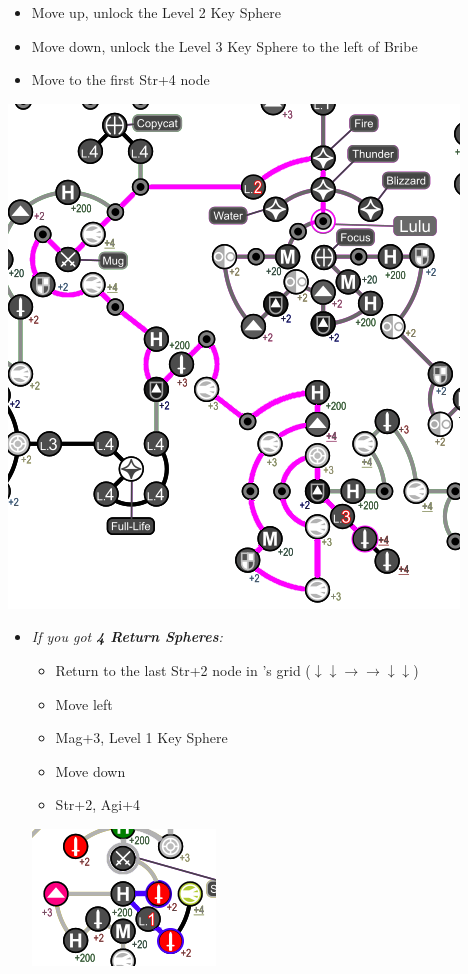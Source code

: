 \begin{spheregrid}
  \begin{multicols}{2}
    \begin{itemize}
      \luluf
      \begin{itemize}
        \item Move up, unlock the Level 2 Key Sphere
        \item Move down, unlock the Level 3 Key Sphere to the left of Bribe
        \item Move to the first Str+4 node
      \end{itemize}
      \includegraphics[width=.75\columnwidth]{graphics/lulu_grid}
      \yunaf
      \begin{itemize}
        \item \textit{If you got \textbf{4 Return Spheres}:}
              \begin{itemize}
                \item Return to the last Str+2 node in \wakka's grid ($\downarrow \downarrow \rightarrow \rightarrow \downarrow \downarrow$)
                \item Move left
                \item Mag+3, Level 1 Key Sphere
                \item Move down
                \item Str+2, Agi+4
              \end{itemize}
              \includegraphics[width=.5\columnwidth]{graphics/4_returns}

\end{itemize}
\end{itemize}
\end{multicols}
\end{spheregrid}
